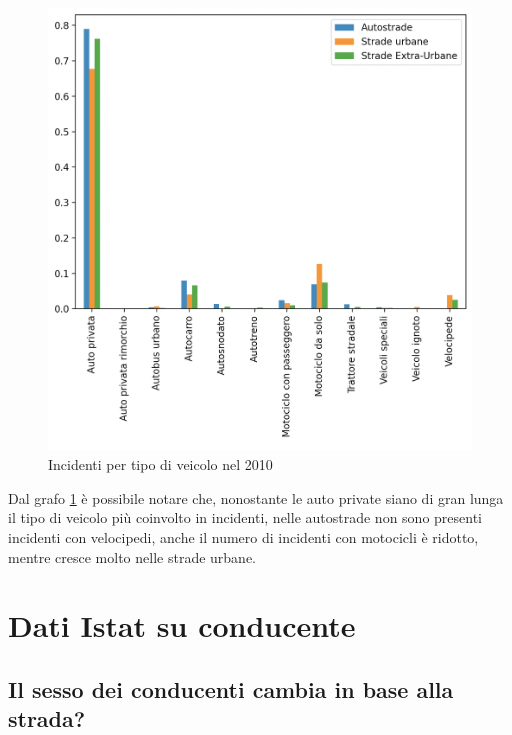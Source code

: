 \documentclass[a4paper]{report}
\begin{document}
\begin{figure}
    \includegraphics[width=\linewidth]{../src/incidenti/incidenti_senza_coords/tipo_veicoli/differenza_strade.png}
    \caption{Incidenti per tipo di veicolo nel 2010}
    \label{fig:differenza-strade}
\end{figure}

Dal grafo \ref{fig:differenza-strade}
è possibile notare che, nonostante le auto private siano di gran lunga il tipo di veicolo 
più coinvolto in incidenti, nelle autostrade non sono presenti incidenti con velocipedi, 
anche il numero di incidenti con motocicli è ridotto, mentre cresce molto nelle strade urbane.


\section{Dati Istat su conducente}

\subsection{Il sesso dei conducenti cambia in base alla strada?}
\end{document}
